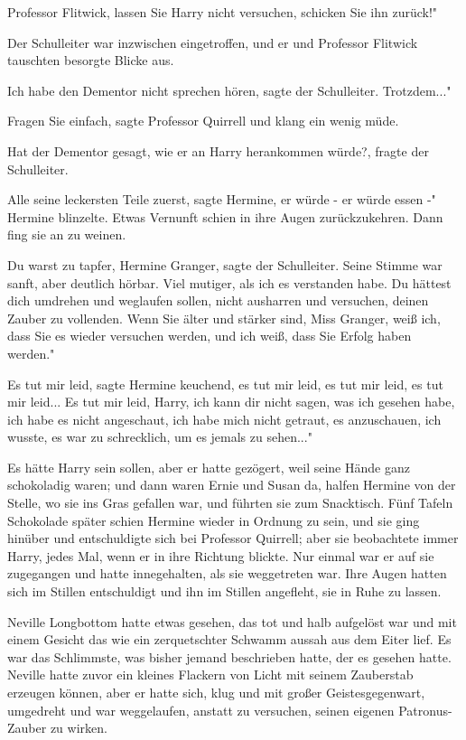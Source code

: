 \glqq Professor Flitwick, lassen Sie Harry nicht versuchen, schicken Sie ihn
zurück!"

Der Schulleiter war inzwischen eingetroffen, und er und Professor Flitwick
tauschten besorgte Blicke aus.

\glqq Ich habe den Dementor nicht sprechen hören\grqq{}, sagte der Schulleiter.
\glqq Trotzdem..."

\glqq Fragen Sie einfach\grqq{}, sagte Professor Quirrell und klang ein wenig
müde.

\glqq Hat der Dementor gesagt, wie er an Harry herankommen würde?\grqq{}, fragte
der Schulleiter.

\glqq Alle seine leckersten Teile zuerst\grqq{}, sagte Hermine, \glqq er würde -
er würde essen -" Hermine blinzelte. Etwas Vernunft schien in ihre Augen
zurückzukehren. Dann fing sie an zu weinen.

\glqq Du warst zu tapfer, Hermine Granger\grqq{}, sagte der Schulleiter. Seine
Stimme war sanft, aber deutlich hörbar. \glqq Viel mutiger, als ich es
verstanden habe. Du hättest dich umdrehen und weglaufen sollen, nicht ausharren
und versuchen, deinen Zauber zu vollenden. Wenn Sie älter und stärker sind, Miss
Granger, weiß ich, dass Sie es wieder versuchen werden, und ich weiß, dass Sie
Erfolg haben werden."

\glqq Es tut mir leid\grqq{}, sagte Hermine keuchend, \glqq es tut mir leid, es
tut mir leid, es tut mir leid... Es tut mir leid, Harry, ich kann dir nicht
sagen, was ich gesehen habe, ich habe es nicht angeschaut, ich habe mich nicht
getraut, es anzuschauen, ich wusste, es war zu schrecklich, um es jemals zu
sehen..."

Es hätte Harry sein sollen, aber er hatte gezögert, weil seine Hände ganz
schokoladig waren; und dann waren Ernie und Susan da, halfen Hermine von der
Stelle, wo sie ins Gras gefallen war, und führten sie zum Snacktisch. Fünf
Tafeln Schokolade später schien Hermine wieder in Ordnung zu sein, und sie ging
hinüber und entschuldigte sich bei Professor Quirrell; aber sie beobachtete
immer Harry, jedes Mal, wenn er in ihre Richtung blickte. Nur einmal war er auf
sie zugegangen und hatte innegehalten, als sie weggetreten war. Ihre Augen
hatten sich im Stillen entschuldigt und ihn im Stillen angefleht, sie in Ruhe zu
lassen.

Neville Longbottom hatte etwas gesehen, das tot und halb aufgelöst war und mit
einem Gesicht das wie ein zerquetschter Schwamm aussah aus dem Eiter lief. Es
war das Schlimmste, was bisher jemand beschrieben hatte, der es gesehen hatte.
Neville hatte zuvor ein kleines Flackern von Licht mit seinem Zauberstab
erzeugen können, aber er hatte sich, klug und mit großer Geistesgegenwart,
umgedreht und war weggelaufen, anstatt zu versuchen, seinen eigenen
Patronus-Zauber zu wirken.

